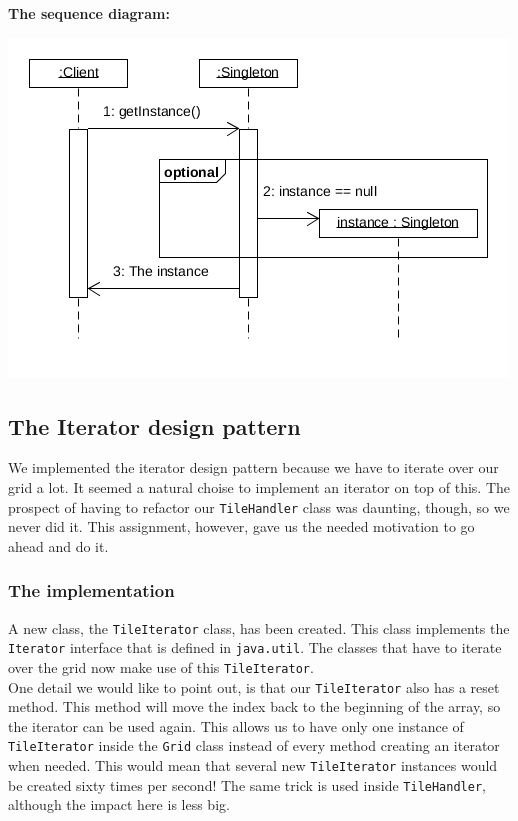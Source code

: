 \documentclass[a4paper,11pt,report]{scrartcl}
\begin{document}
\newpage\textbf{The sequence diagram:}\\
\centerline{\includegraphics[scale=1.0]{sources/SingletonSequence}}

\newpage\subsection{The Iterator design pattern}
We implemented the iterator design pattern because we have to iterate over our
grid a lot. It seemed a natural choise to implement an iterator on top of this.
The prospect of having to refactor our \texttt{TileHandler} class was daunting, though,
so we never did it. This assignment, however, gave us the needed motivation to
go ahead and do it.

\subsubsection{The implementation}
A new class, the \texttt{TileIterator} class, has been created. This class implements the
\texttt{Iterator} interface that is defined in \texttt{java.util}. The classes that have to
iterate over the grid now make use of this \texttt{TileIterator}.\\

One detail we would like to point out, is that our \texttt{TileIterator} also has a reset
method. This method will move the index back to the beginning of the array, so
the iterator can be used again. This allows us to have only one instance of
\texttt{TileIterator} inside the \texttt{Grid} class instead of every method creating an iterator
when needed. This would mean that several new \texttt{TileIterator} instances would be
created sixty times per second! The same trick is used inside
\texttt{TileHandler}, although the impact here is less big.
\end{document}
